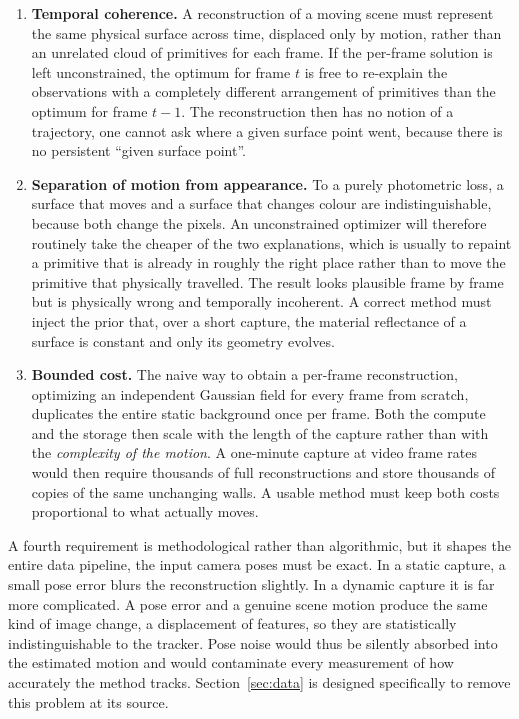 \begin{enumerate}
    \item \textbf{Temporal coherence.} A reconstruction of a moving scene must
    represent the same physical surface across time, displaced only by
    motion, rather than an unrelated cloud of primitives for each frame. If the
    per-frame solution is left unconstrained, the optimum for frame $t$ is free to
    re-explain the observations with a completely different arrangement of
    primitives than the optimum for frame $t-1$. The reconstruction then has no
    notion of a trajectory, one cannot ask where a given surface point went,
    because there is no persistent \enquote{given surface point}.

    \item \textbf{Separation of motion from appearance.} To a purely photometric
    loss, a surface that moves and a surface that changes colour are
    indistinguishable, because both change the pixels. An unconstrained optimizer will
    therefore routinely take the cheaper of the two explanations, which is usually
    to repaint a primitive that is already in roughly the right place rather
    than to move the primitive that physically travelled. The result looks
    plausible frame by frame but is physically wrong and temporally incoherent. A
    correct method must inject the prior that, over a short capture, the material
    reflectance of a surface is constant and only its geometry evolves.

    \item \textbf{Bounded cost.} The naive way to obtain a per-frame reconstruction,
    optimizing an independent Gaussian field for every frame from scratch,
    duplicates the entire static background once per frame. Both the compute and the
    storage then scale with the length of the capture rather than with the
    \emph{complexity of the motion}. A one-minute capture at video frame rates would
    then require thousands of full reconstructions and store thousands of copies of
    the same unchanging walls. A usable method must keep both costs proportional to
    what actually moves.
\end{enumerate}

A fourth requirement is methodological rather than algorithmic, but it shapes the
entire data pipeline, the input camera poses must be exact. In a static
capture, a small pose error blurs the reconstruction slightly. In a dynamic
capture it is far more complicated. A pose error and a genuine scene motion produce
the same kind of image change, a displacement of features, so they are
statistically indistinguishable to the tracker. Pose noise would thus be silently
absorbed into the estimated motion and would contaminate every measurement of how
accurately the method tracks. Section~\ref{sec:data} is designed specifically to
remove this problem at its source.

